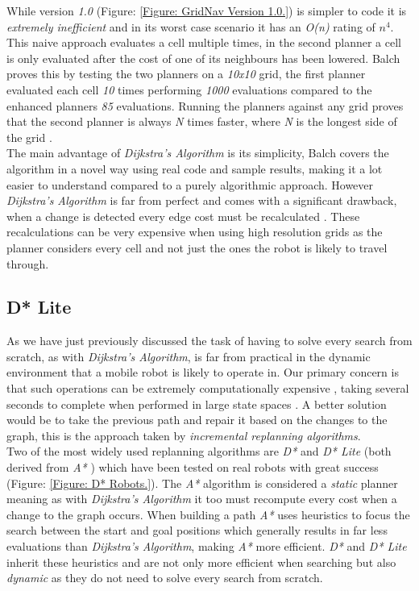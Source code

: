 \noindent
While version \textit{1.0} (Figure: \ref{Figure: GridNav Version 1.0.}) is simpler to code it is \textit{extremely inefficient} \cite{GRIDNAV95} and in its worst case scenario it has an \textit{O(n)} rating of \textit{$n^{4}$}. This naive approach evaluates a cell multiple times, in the second planner a cell is only evaluated after the cost of one of its neighbours has been lowered. Balch proves this by testing the two planners on a \textit{10x10} grid, the first planner evaluated each cell \textit{10} times performing \textit{1000} evaluations compared to the enhanced planners \textit{85} evaluations. Running the planners against any grid proves that the second planner is always \textit{N} times faster, where \textit{N} is the longest side of the grid \cite{GRIDNAV95}.\\ 

\noindent
The main advantage of \textit{Dijkstra's Algorithm} is its simplicity, Balch covers the algorithm in a novel way using real code and sample results, making it a lot easier to understand compared to a purely algorithmic approach. However \textit{Dijkstra's Algorithm} is far from perfect and comes with a significant drawback, when a change is detected every edge cost must be recalculated \cite{GRIDNAV95}. These recalculations can be very expensive  when using high resolution grids \cite{HEURISTIC} as the planner considers every cell and not just the ones the robot is likely to travel through. 

\newpage

\subsection{D* Lite}
\noindent
As we have just previously discussed the task of having to solve every search from scratch, as with \textit{Dijkstra's Algorithm}, is far from practical in the dynamic environment that a mobile robot is likely to operate in. Our primary concern is that such operations can be extremely computationally expensive \cite{HEURISTIC}, taking several seconds to complete when performed in large state spaces \cite{D*LITE}. A better solution would be to take the previous path and repair it based on the changes to the graph, this is the approach taken by \textit{incremental replanning algorithms}.\\

\noindent
Two of the most widely used replanning algorithms are \textit{D*} \cite{D*} and \textit{D* Lite} \cite{D*LITE} (both derived from \textit{A*} \cite{A*}) which have been tested on real robots with great success (Figure: \ref{Figure: D* Robots.}). The \textit{A*} algorithm is considered a \textit{static} planner meaning as with \textit{Dijkstra's Algorithm} it too must recompute every cost when a change to the graph occurs. When building a path \textit{A*} uses heuristics to focus the search between the start and goal positions \cite{A*} which generally results in far less evaluations than \textit{Dijkstra's Algorithm}, making \textit{A*} more efficient. \textit{D*} and \textit{D* Lite} inherit these heuristics and are not only more efficient when searching but also \textit{dynamic} as they do not need to solve every search from scratch.\\

